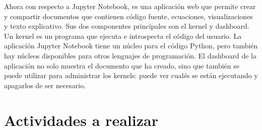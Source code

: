 \documentclass{article} %
\begin{document}
Ahora con respecto a Jupyter Notebook,  es una aplicación web que permite crear y compartir documentos que contienen código fuente, ecuaciones, visualizaciones y texto explicativo. Sus dos componentes principales son el kernel y dashboard. Un kernel es un programa que ejecuta e introspecta el código del usuario. La aplicación Jupyter Notebook tiene un núcleo para el código Python, pero también hay núcleos disponibles para otros lenguajes de programación. El dashboard  de la aplicación no solo muestra el documento que ha creado, sino que también se puede utilizar para administrar los kernels: puede ver cualés se están ejecutando y apagarlos de ser necesario.

\section{Actividades a realizar}
\end{document}
